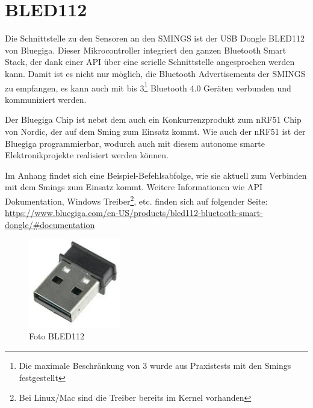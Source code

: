 


\section{BLED112}
Die Schnittstelle zu den Sensoren an den SMINGS ist der USB Dongle BLED112 von Bluegiga. Dieser Mikrocontroller integriert den ganzen Bluetooth Smart Stack, der dank einer API über eine serielle Schnittstelle angesprochen werden kann. Damit ist es nicht nur möglich, die Bluetooth Advertisements der SMINGS zu empfangen, es kann auch mit bis 3\footnote{Die maximale Beschränkung von 3 wurde aus Praxistests mit den Smings festgestellt} Bluetooth 4.0 Geräten verbunden und kommuniziert werden.

Der Bluegiga Chip ist nebst dem auch ein Konkurrenzprodukt zum nRF51 Chip von Nordic, der auf dem Sming zum Einsatz kommt. Wie auch der nRF51 ist der Bluegiga programmierbar, wodurch auch mit diesem autonome smarte Elektronikprojekte realisiert werden können.

Im Anhang findet sich eine Beispiel-Befehlsabfolge, wie sie aktuell zum Verbinden mit dem Smings zum Einsatz kommt. Weitere Informationen wie API Dokumentation, Windows Treiber\footnote{Bei Linux/Mac sind die Treiber bereits im Kernel vorhanden}, etc. finden sich auf folgender Seite:
 \url{https://www.bluegiga.com/en-US/products/bled112-bluetooth-smart-dongle/#documentation}
 
\begin{figure}[hbtp]
	\center
	\includegraphics[width=4cm]{bilder/bled112.jpg}
	\caption{Foto BLED112}
	\label{fig:bled112}
\end{figure}

